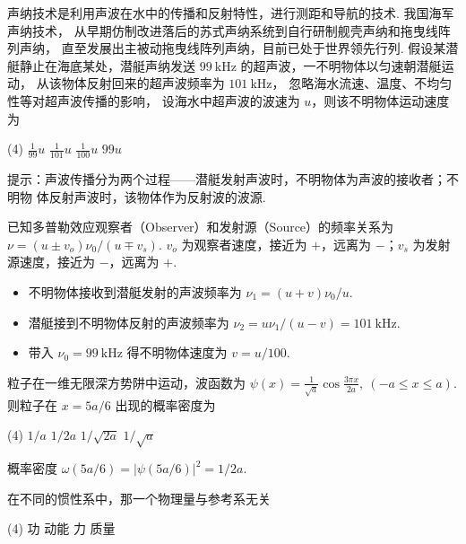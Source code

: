 \documentclass[quiet]{ctexart}
\begin{document}
\begin{problem}
  声纳技术是利用声波在水中的传播和反射特性，进行测距和导航的技术. 我国海军声纳技术，
  从早期仿制改进落后的苏式声纳系统到自行研制舰壳声纳和拖曳线阵列声纳，
  直至发展出主被动拖曳线阵列声纳，目前已处于世界领先行列.
  假设某潜艇静止在海底某处，潜艇声纳发送 $\qty{99}\kHz$ 的超声波，一不明物体以匀速朝潜艇运动，
  从该物体反射回来的超声波频率为 $\qty{101}\kHz$，
  忽略海水流速、温度、不均匀性等对超声波传播的影响，
  设海水中超声波的波速为 $u$，则该不明物体运动速度为
  \begin{tasks}(4)
    \task $\frac{1}{99}u$
    \task $\frac{1}{101}u$
    \task[\true] $\frac{1}{100}u$
    \task $99u$
  \end{tasks}
\end{problem}
\begin{note}
  提示：声波传播分为两个过程——潜艇发射声波时，不明物体为声波的接收者；不明物
  体反射声波时，该物体作为反射波的波源.
\end{note}
\begin{solution}
  已知多普勒效应观察者（Observer）和发射源（Source）的频率关系为
  $\nu = (u \pm v_o)\nu_0/(u \mp v_s)$.
  $v_o$ 为观察者速度，接近为 $+$，远离为 $-$；$v_s$ 为发射源速度，接近为 $-$，远离为 $+$.
  \begin{itemize}
    \item 不明物体接收到潜艇发射的声波频率为 $\nu_1 = (u + v)\nu_0/u$.
    \item 潜艇接到不明物体反射的声波频率为 $\nu_2 = u \nu_1/(u - v) = \qty{101}\kHz$.
    \item 带入 $\nu_0 = \qty{99}\kHz$ 得不明物体速度为 $v = u/100$.
  \end{itemize}
\end{solution}

\begin{problem}
  粒子在一维无限深方势阱中运动，波函数为
  $\psi(x) = \frac{1}{\sqrt a} \cos\frac{3\pi x}{2a},\ (-a \leq x \leq a)$.
  则粒子在 $x = 5a/6$ 出现的概率密度为
  \begin{tasks}(4)
      \task $1/a$
      \task[\true] $1/2a$
      \task $1/\sqrt{2a}$
      \task $1/\sqrt{a}$
  \end{tasks}
\end{problem}
\begin{solution}
  概率密度 $\omega(5a/6) = |\psi(5a/6)|^2 = 1/2a$. 
\end{solution}

\begin{problem}
  在不同的惯性系中，那一个物理量与参考系无关
  \begin{tasks}(4)
    \task 功
    \task 动能
    \task[\true] 力
    \task 质量
  \end{tasks}
\end{problem}
\end{document}
